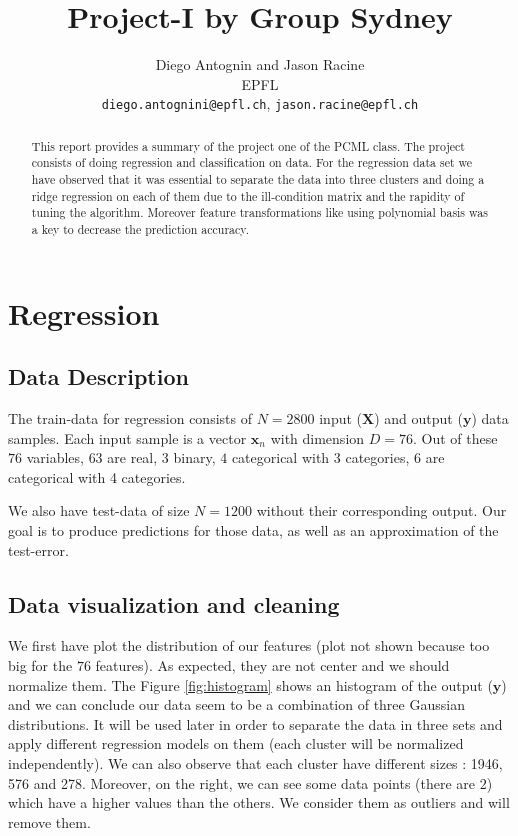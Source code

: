 \documentclass{article} %
\title{Project-I by Group Sydney}
\author{
Diego Antognin and Jason Racine \\
EPFL \\
\texttt{diego.antognini@epfl.ch}, \texttt{jason.racine@epfl.ch} \\
}
\begin{document}
\maketitle

\begin{abstract}
This report provides a summary of the project one of the PCML class. The project consists of doing regression and classification on data. For the regression data set we have observed that it was essential to separate the data into three clusters and doing a ridge regression on each of them due to the ill-condition matrix and the rapidity of tuning the algorithm. Moreover feature transformations like using polynomial basis was a key to decrease the prediction accuracy.
\end{abstract}

\section{Regression}

\subsection{Data Description}

The train-data for regression consists of $N = 2800$ input ($\mathbf{X}$) and output ($\mathbf{y}$) data samples. Each input sample is a vector $\mathbf{x}_n$ with dimension $D = 76$. Out of these $76$ variables, $63$ are real, $3$ binary, $4$ categorical with 3 categories, $6$ are categorical with 4 categories.

We also have test-data of size $N=1200$ without their corresponding output. Our goal is to produce predictions for those data, as well as an approximation of the test-error.

\subsection{Data visualization and cleaning}

We first have plot the distribution of our features (plot not shown because too big for the $76$ features). As expected, they are not center and we should normalize them. The Figure \ref{fig:histogram} shows an histogram of the output ($\mathbf{y}$) and we can conclude our data  seem to be a combination of three Gaussian distributions. It will be used later in order to separate the data in three sets and apply different regression models on them (each cluster will be normalized independently). We can also observe that each cluster have different sizes : 1946, 576 and 278. Moreover, on the right, we can see some data points (there are $2$) which have a higher values than the others. We consider them as outliers and will remove them.
\end{document}
